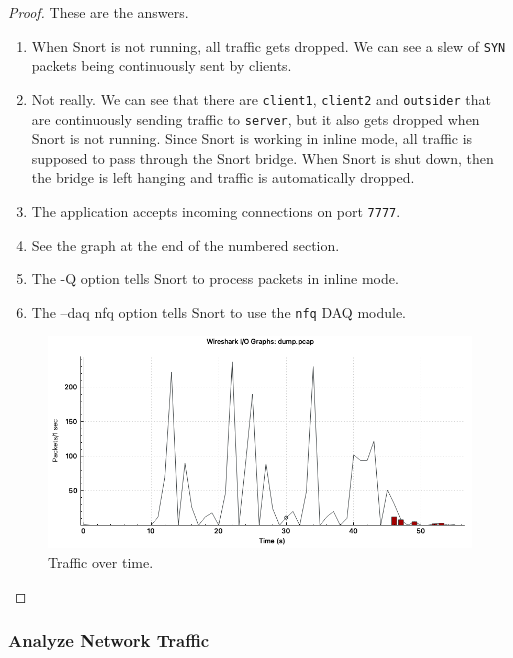 \documentclass[a4paper,11pt,hidelinks]{article}
\begin{document}
\begin{proof}
    These are the answers.
    \begin{enumerate}
        \item When Snort is not running, all traffic gets dropped. We can see a slew of \verb=SYN= packets being continuously sent by clients.
        \item Not really. We can see that there are \verb=client1=, \verb=client2= and \verb=outsider= that are continuously sending traffic to \verb=server=, but it also gets dropped when Snort is not running. Since Snort is working in inline mode, all traffic is supposed to pass through the Snort bridge. When Snort is shut down, then the bridge is left hanging and traffic is automatically dropped.
        \item The application accepts incoming connections on port \verb=7777=.
        \item See the graph at the end of the numbered section.
        \item The -Q option tells Snort to process packets in inline mode.
        \item The --daq nfq option tells Snort to use the \verb=nfq= DAQ module.
    \end{enumerate}

    \begin{figure}[ht!]
        \centering
        \includegraphics[width=\textwidth]{../drawable/traffic.png}
        \caption{Traffic over time.}
    \end{figure}

\end{proof}

\clearpage

\subsubsection{Analyze Network Traffic}
\end{document}
